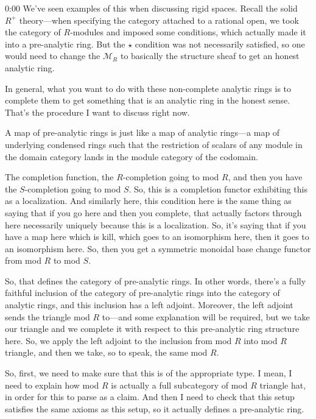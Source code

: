 \begin{unfinished}{0:00}
We've seen examples of this when discussing rigid spaces. Recall the solid $R^+$ theory---when specifying the category attached to a rational open, we took the category of $R$-modules and imposed some conditions, which actually made it into a pre-analytic ring. But the $\star$ condition was not necessarily satisfied, so one would need to change the $\mathcal{M}_R$ to basically the structure sheaf to get an honest analytic ring.

In general, what you want to do with these non-complete analytic rings is to complete them to get something that is an analytic ring in the honest sense. That's the procedure I want to discuss right now.

A map of pre-analytic rings is just like a map of analytic rings---a map of underlying condensed rings such that the restriction of scalars of any module in the domain category lands in the module category of the codomain.

The completion function, the $R$-completion going to mod $R$, and then you have the $S$-completion going to mod $S$. So, this is a completion functor exhibiting this as a localization. And similarly here, this condition here is the same thing as saying that if you go here and then you complete, that actually factors through here necessarily uniquely because this is a localization. So, it's saying that if you have a map here which is kill, which goes to an isomorphism here, then it goes to an isomorphism here. So, then you get a symmetric monoidal base change functor from mod $R$ to mod $S$.

So, that defines the category of pre-analytic rings. In other words, there's a fully faithful inclusion of the category of pre-analytic rings into the category of analytic rings, and this inclusion has a left adjoint. Moreover, the left adjoint sends the triangle mod $R$ to---and some explanation will be required, but we take our triangle and we complete it with respect to this pre-analytic ring structure here. So, we apply the left adjoint to the inclusion from mod $R$ into mod $R$ triangle, and then we take, so to speak, the same mod $R$.

So, first, we need to make sure that this is of the appropriate type. I mean, I need to explain how mod $R$ is actually a full subcategory of mod $R$ triangle hat, in order for this to parse as a claim. And then I need to check that this setup satisfies the same axioms as this setup, so it actually defines a pre-analytic ring.


\end{unfinished}
